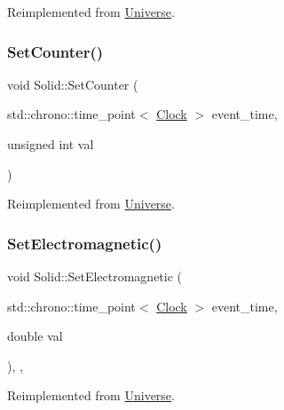 Reimplemented from \mbox{\hyperlink{classUniverse_a3b3da7c86a7b75e5e5c0b7972ac82a87}{Universe}}.

\mbox{\label{classSolid_aea949040518e505ed39b1456a360c5e0}} 
\subsubsection{\texorpdfstring{Set\+Counter()}{SetCounter()}}
{\footnotesize\ttfamily void Solid\+::\+Set\+Counter (\begin{DoxyParamCaption}\item[{std\+::chrono\+::time\+\_\+point$<$ \mbox{\hyperlink{universe_8h_a0ef8d951d1ca5ab3cfaf7ab4c7a6fd80}{Clock}} $>$}]{event\+\_\+time,  }\item[{unsigned int}]{val }\end{DoxyParamCaption})\hspace{0.3cm}{\ttfamily [virtual]}}



Reimplemented from \mbox{\hyperlink{classUniverse_aa22202ae740eb1355529afcb13285e91}{Universe}}.

\mbox{\label{classSolid_a9a660f9d94f597712c67922aa1d4d795}} 
\subsubsection{\texorpdfstring{Set\+Electromagnetic()}{SetElectromagnetic()}}
{\footnotesize\ttfamily void Solid\+::\+Set\+Electromagnetic (\begin{DoxyParamCaption}\item[{std\+::chrono\+::time\+\_\+point$<$ \mbox{\hyperlink{universe_8h_a0ef8d951d1ca5ab3cfaf7ab4c7a6fd80}{Clock}} $>$}]{event\+\_\+time,  }\item[{double}]{val }\end{DoxyParamCaption})\hspace{0.3cm}{\ttfamily [inline]}, {\ttfamily [final]}, {\ttfamily [virtual]}}



Reimplemented from \mbox{\hyperlink{classUniverse_aa981fc7e252b1fbbb675f0371860954d}{Universe}}.

\mbox{\label{classSolid_a6617ae9fe4707d760a23b54eddf00dec}} 
